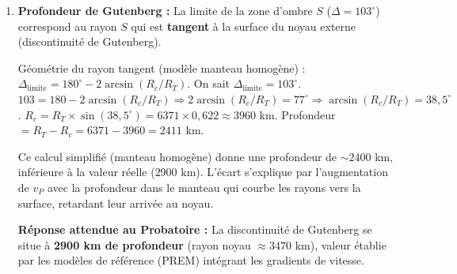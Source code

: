 \documentclass[11pt]{article}
\begin{document}
\begin{exoresolu}
\begin{enumerate}
    \item \textbf{Profondeur de Gutenberg :}
    La limite de la zone d'ombre $S$ ($\Delta = 103^\circ$) correspond au rayon $S$ qui est \textbf{tangent} à la surface du noyau externe (discontinuité de Gutenberg).
    \begin{center}
    \end{center}
    Géométrie du rayon tangent (modèle manteau homogène) : $\Delta_{\text{limite}} = 180^\circ - 2 \arcsin(R_c/R_T)$.
    On sait $\Delta_{\text{limite}} = 103^\circ$.
    $103 = 180 - 2 \arcsin(R_c/R_T) \Rightarrow 2 \arcsin(R_c/R_T) = 77^\circ \Rightarrow \arcsin(R_c/R_T) = 38,5^\circ$.
    $R_c = R_T \times \sin(38,5^\circ) = 6371 \times 0,622 \approx 3960$ km.
    Profondeur $= R_T - R_c = 6371 - 3960 = 2411$ km.
    \begin{attention}Ce calcul simplifié (manteau homogène) donne une profondeur de $\sim 2400$ km, inférieure à la valeur réelle ($2900$ km). L'écart s'explique par l'augmentation de $v_P$ avec la profondeur dans le manteau qui courbe les rayons vers la surface, retardant leur arrivée au noyau.\end{attention}
    \textbf{Réponse attendue au Probatoire :} La discontinuité de Gutenberg se situe à \textbf{2900 km de profondeur} (rayon noyau $\approx 3470$ km), valeur établie par les modèles de référence (PREM) intégrant les gradients de vitesse.
\end{enumerate}
\end{exoresolu}
\end{document}
